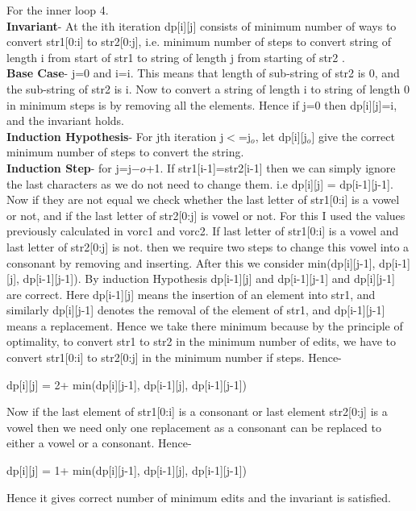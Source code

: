 \documentclass{article}
\begin{document}
For the inner loop 4.\\
\textbf{Invariant}- At the ith iteration dp[i][j] consists of minimum number of ways to convert str1[0:i] to str2[0:j], i.e. minimum number of steps to convert string of length i from start of str1 to string of length j from starting of str2 .\\
\textbf{Base Case}- j=0 and i=i. This means that length of sub-string of str2 is 0, and the sub-string of str2 is i. Now to convert a string of length i to string of length 0  in minimum steps is by removing all the elements.  Hence if j=0 then dp[i][j]=i, and the invariant holds.\\
\textbf{Induction Hypothesis}- For jth iteration j$<$=j$_o$, let dp[i][j$_o$] give the correct minimum number of steps to convert the string.\\
\textbf{Induction Step}- for j=j$-o$+1. If str1[i-1]=str2[i-1] then we can simply ignore the last characters as we do not need to change them. i.e dp[i][j] = dp[i-1][j-1].
Now if they are not equal we check whether the last letter of str1[0:i] is a vowel or not, and if the last letter of str2[0:j] is vowel or not. For this I used the values previously calculated in vorc1 and vorc2. If last letter of str1[0:i] is a vowel and last letter of str2[0:j] is not. then we require two steps to change this vowel into a consonant by removing and inserting. After this we consider min(dp[i][j-1], dp[i-1][j], dp[i-1][j-1]). By induction Hypothesis dp[i-1][j] and dp[i-1][j-1] and dp[i][j-1] are correct. Here dp[i-1][j] means the insertion of an element into str1, and similarly dp[i][j-1] denotes the removal of the element of str1, and dp[i-1][j-1] means a replacement. Hence we take there minimum because by the principle of optimality, to convert str1 to str2 in the minimum number of edits, we have to convert str1[0:i] to str2[0:j] in the minimum number if steps. Hence- 
\begin{center}dp[i][j] = 2+ min(dp[i][j-1], dp[i-1][j], dp[i-1][j-1])\end{center}
Now if the last element of str1[0:i] is a consonant or last element str2[0:j] is a vowel then we need only one replacement as a consonant can  be replaced to either a vowel or a consonant. Hence-
\begin{center}dp[i][j] = 1+ min(dp[i][j-1], dp[i-1][j], dp[i-1][j-1])\end{center} Hence it gives correct number of minimum edits and the invariant is satisfied.\\
\end{document}
